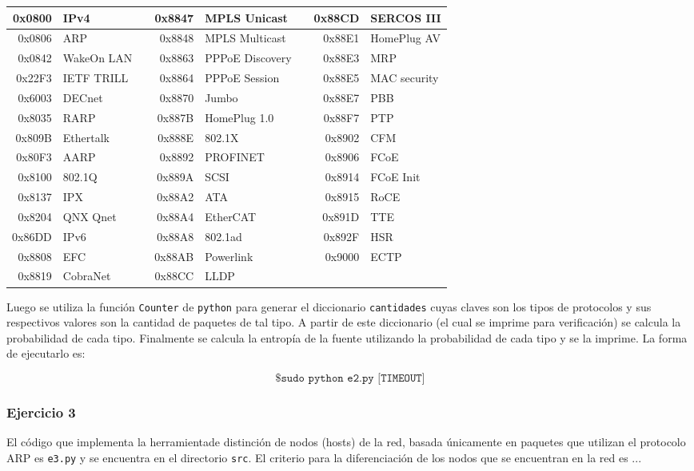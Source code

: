 \begin{tabular}{|r|l|c|r|l|c|r|l|}
\hline
0x0800 & IPv4 & & 0x8847 & MPLS Unicast & & 0x88CD & SERCOS III \\
\hline
0x0806 & ARP & & 0x8848 & MPLS Multicast & & 0x88E1 & HomePlug AV \\
\hline
0x0842 & WakeOn LAN & & 0x8863 & PPPoE Discovery & & 0x88E3 & MRP \\
\hline
0x22F3 & IETF TRILL & & 0x8864 & PPPoE Session & & 0x88E5 & MAC security \\
\hline
0x6003 & DECnet & & 0x8870 & Jumbo & & 0x88E7 & PBB \\
\hline
0x8035 & RARP & & 0x887B & HomePlug 1.0 & & 0x88F7 & PTP \\
\hline
0x809B & Ethertalk & & 0x888E & 802.1X & & 0x8902 & CFM \\
\hline
0x80F3 & AARP & & 0x8892 & PROFINET & & 0x8906 & FCoE \\
\hline
0x8100 & 802.1Q & & 0x889A & SCSI & & 0x8914 & FCoE Init \\
\hline
0x8137 & IPX & & 0x88A2 & ATA & & 0x8915 & RoCE \\
\hline
0x8204 & QNX Qnet & & 0x88A4 & EtherCAT & & 0x891D & TTE  \\
\hline
0x86DD & IPv6 & & 0x88A8 & 802.1ad & & 0x892F & HSR \\
\hline
0x8808 & EFC & & 0x88AB & Powerlink & & 0x9000 & ECTP \\
\hline
0x8819 & CobraNet & & 0x88CC & LLDP & & & \\
\hline
\end{tabular}

Luego se utiliza la función \texttt{Counter} de \texttt{python} para generar el diccionario \texttt{cantidades}
cuyas claves son los tipos de protocolos y sus respectivos valores son la cantidad de paquetes de tal tipo.
A partir de este diccionario (el cual se imprime para verificación) se calcula la probabilidad de cada tipo.
Finalmente se calcula la entropía de la fuente utilizando la probabilidad de cada tipo y se la imprime. La
forma de ejecutarlo es:

\[
\texttt{\$ sudo python e2.py [TIMEOUT]}
\]

\subsubsection{Ejercicio 3}
El código que implementa la herramientade distinción de nodos (hosts) de la red, basada únicamente en paquetes que
utilizan el protocolo ARP es \texttt{e3.py} y se encuentra en el directorio \texttt{src}. El criterio para la
diferenciación de los nodos que se encuentran en la red es ... %

